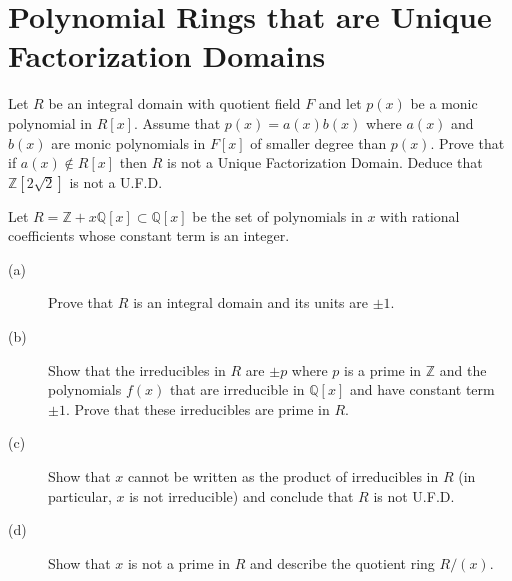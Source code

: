 \documentclass[12pt,leqno]{book}
\numberwithin{equation}{section}
\newcommand{\question}[2] {\vspace{.25in}\noindent\fbox{#1} #2 \vspace{.10in}}
\theoremstyle{definition}
\begin{document}
\section{Polynomial Rings that are Unique Factorization Domains}
\question{1}{Let $R$ be an integral domain with quotient field $F$ and let $p(x)$ be a monic polynomial in $R[x]$. Assume that $p(x)=a(x)b(x)$ where $a(x)$ and $b(x)$ are monic polynomials in $F[x]$ of smaller degree than $p(x)$. Prove that if $a(x)\notin R[x]$ then $R$ is not a Unique Factorization Domain. Deduce that $\mathbb{Z}[2\sqrt{2}]$ is not a U.F.D.}

\question{4}{Let $R=\mathbb{Z}+x\mathbb{Q}[x]\subset\mathbb{Q}[x]$ be the set of polynomials in $x$ with rational coefficients whose constant term is an integer.}
\begin{description}
 \item [(a)] Prove that $R$ is an integral domain and its units are $\pm1$.
 \item [(b)] Show that the irreducibles in $R$ are $\pm p$ where $p$ is a prime in $\mathbb{Z}$ and the polynomials $f(x)$ that are irreducible in $\mathbb{Q}[x]$ and have constant term $\pm1$. Prove that these irreducibles are prime in $R$.
 \item [(c)] Show that $x$ cannot be written as the product of irreducibles in $R$ (in particular, $x$ is not irreducible) and conclude that $R$ is not U.F.D.
 \item [(d)] Show that $x$ is not a prime in $R$ and describe the quotient ring $R/(x)$. 
\end{description}
\end{document}
